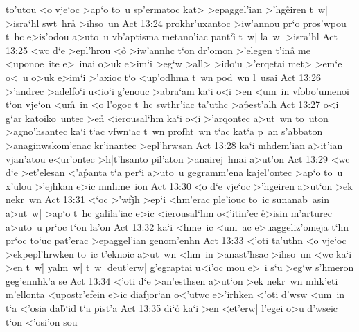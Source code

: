 to'utou
<o
vje`oc
>ap`o
to~u
sp'ermatoc
kat>
>epaggel'ian
>'hg\r{e}iren
t~w|
>isra`hl
swt~hra\r{}
>ihso~un\bibvsend
\vs Act 13:24
prokhr'uxantoc
>iw'annou
pr`o
pros'wpou
t~hc
e>is'odou
a>uto~u
vb'aptisma
metano'iac
pant`i\r{}
t~w|
la~w|
>isra'hl\bibvsend
\vs Act 13:25
<wc
d`e
>epl'hrou
<o\r{}
>iw'annhc
t`on
dr'omon
>'elegen
t'ina\r{}
me
<uponoe~ite
e>~inai
o>uk
e>im`i
>eg`w
>all>
>ido`u
>'erqetai
met>
>em`e
o<~u
o>uk
e>im`i
>'axioc
t`o
<up'odhma
t~wn
pod~wn
l~usai\bibvsend
\vs Act 13:26
>'andrec
>adelfo`i
u<io`i
g'enouc
>abra`am
ka`i
o<i
>en
<um~in
vfobo'umenoi
t`on
vje`on
<u\r{m}~in
<o
l'ogoc
t~hc
swthr'iac
ta'uthc
>a\r{p}est'alh\bibvsend
{}
\vs Act 13:27
o<i
g`ar
katoiko~untec
>e\r{n}
<ierousal`hm
ka`i
o<i
>'arqontec
a>ut~wn
to~uton
>agno'hsantec
ka`i
t`ac
vfwn`ac
t~wn
profht~wn
t`ac
kat`a
p~an
s'abbaton
>anaginwskom'enac
kr'inantec
>epl'hrwsan\bibvsend
\vs Act 13:28
ka`i
mhdem'ian
a>it'ian
vjan'atou
e<ur'ontec
>h|t'hsanto
pil'aton
>anairej~hnai
a>ut'on\bibvsend
\vs Act 13:29
<wc
d`e
>et'elesan
<'a\r{p}anta
t`a
per`i
a>uto~u
gegramm'ena
kajel'ontec
>ap`o
to~u
x'ulou
>'ejhkan
e>ic
mnhme~ion\bibvsend
\vs Act 13:30
<o
d`e
vje`oc
>'hgeiren
a>ut`on
>ek
nekr~wn\bibvsend
\vs Act 13:31
<`oc
>'wfjh
>ep`i
<hm'erac
ple'iouc
to~ic
sunanab~asin
a>ut~w|
>ap`o
t~hc
galila'iac
e>ic
<ierousal`hm
o<'itin'ec
\r{e}>isin
m'arturec
a>uto~u
pr`oc
t`on
la'on\bibvsend
\vs Act 13:32
ka`i
<hme~ic
<um~ac
e>uaggeliz'omeja
t`hn
pr`oc
to`uc
pat'erac
>epaggel'ian
genom'enhn\bibvsend
\vs Act 13:33
<'oti
ta'uthn
<o
vje`oc
>ekpepl'hrwken
to~ic
t'eknoic
a>ut~wn
<hm~in
>anast'hsac
>ihso~un
<wc
ka`i
>en
t~w|\r{}
yalm~w|
t~w|
deut'erw|
g'egraptai
u<i'oc
mou
e>~i
s`u
>eg`w
s'hmeron
geg'ennhk'a
se\bibvsend
\vs Act 13:34
<'oti
d`e
>an'esthsen
a>ut`on
>ek
nekr~wn
mhk'eti
m'ellonta
<upostr'efein
e>ic
diafjor`an
o<'utwc
e>'irhken
<'oti
d'wsw
<um~in
t`a
<'osia
da\r{b}`id
t`a
pist'a\bibvsend
\vs Act 13:35
di`o\r{}
ka`i
>en
<et'erw|
l'egei
o>u
d'wseic
t`on
<'osi'on
sou
